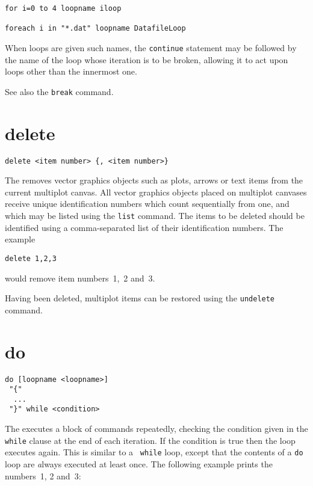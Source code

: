 \begin{verbatim}
for i=0 to 4 loopname iloop

foreach i in "*.dat" loopname DatafileLoop
\end{verbatim}

\noindent When loops are given such names, the {\tt continue} statement may be
followed by the name of the loop whose iteration is to be broken, allowing it
to act upon loops other than the innermost one.

See also the {\tt break} command.


\section{delete}

\begin{verbatim}
delete <item number> {, <item number>}
\end{verbatim}

The  removes vector graphics objects such as plots, arrows or
text items from the current multiplot canvas. All vector graphics objects
placed on multiplot canvases receive unique identification numbers which count
sequentially from one, and which may be listed using the {\tt list} command.
The items to be deleted should be identified using a comma-separated list of
their identification numbers. The example

\begin{verbatim}
delete 1,2,3
\end{verbatim}

\noindent would remove item numbers~1,~2 and~3.

Having been deleted, multiplot items can be restored using the {\tt undelete}
command.


\section{do}

\begin{verbatim}
do [loopname <loopname>]
 "{"
  ...
 "}" while <condition>
\end{verbatim}

The  executes a block of commands repeatedly, checking the
condition given in the {\tt while} clause at the end of each iteration.  If the
condition is true then the loop executes again. This is similar to a {\tt
while} loop, except that the contents of a {\tt do} loop are {\emph always}
executed at least once.  The following example prints the numbers~1, 2 and~3:

